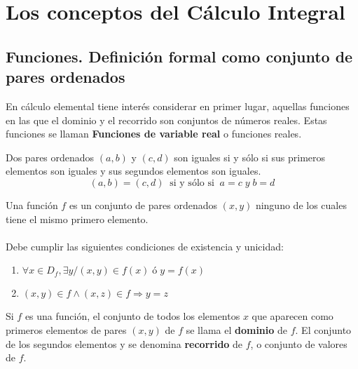 \chapter{Los conceptos del Cálculo Integral}
\setcounter{chapter}{1}
\setcounter{section}{2}

\section{Funciones. Definición formal como conjunto de pares ordenados}
En cálculo elemental tiene interés considerar en primer lugar, aquellas funciones en las que el dominio y el recorrido son conjuntos de números reales. Estas funciones se llaman 
\textbf{Funciones de variable real} o funciones reales.\\

    \begin{tcolorbox}[colframe=white]
        \begin{def.}
            Dos pares ordenados $(a,b)$ y $(c,d)$ son iguales si y sólo si sus primeros elementos son iguales y sus segundos elementos son iguales.
            $$(a,b) = (c,d) \; \; \mbox{si y sólo si} \; \; a=c \; y \; b=d$$
        \end{def.}
    \end{tcolorbox}

    \begin{tcolorbox}[colframe=white]
        \begin{def.}
            Una función $f$ es un conjunto de pares ordenados $(x,y)$ ninguno de los cuales tiene el mismo primero elemento.\\\\
            Debe cumplir las siguientes condiciones de existencia y unicidad:
            \begin{enumerate}[\bfseries (i)]
                \item $\forall x \in D_f, \exists y / (x,y) \in f(x) \; ó \; y=f(x)$
                \item $(x,y) \in  f \land (x,z) \in  f \Rightarrow y = z$
            \end{enumerate}
        \end{def.}
    \end{tcolorbox}

    \begin{tcolorbox}[colframe=white]
        \begin{def.}
            Si $f$ es una función, el conjunto de todos los elementos $x$ que aparecen como primeros elementos de pares $(x,y)$ de $f$ se llama el \textbf{dominio} de $f$.  El conjunto de los segundos elementos y se denomina \textbf{recorrido} de $f$, o conjunto de valores de $f$.
        \end{def.}
    \end{tcolorbox}

